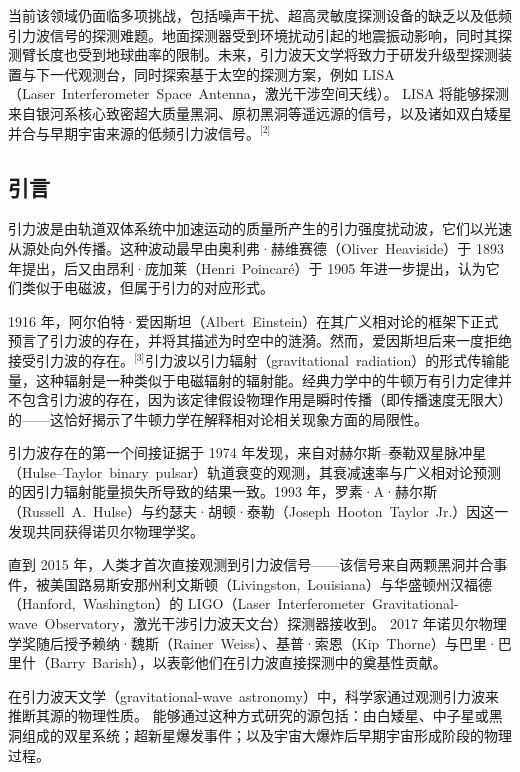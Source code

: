 当前该领域仍面临多项挑战，包括噪声干扰、超高灵敏度探测设备的缺乏以及低频引力波信号的探测难题。地面探测器受到环境扰动引起的地震振动影响，同时其探测臂长度也受到地球曲率的限制。未来，引力波天文学将致力于研发升级型探测装置与下一代观测台，同时探索基于太空的探测方案，例如 LISA（Laser~Interferometer~Space~Antenna，激光干涉空间天线）。  
LISA 将能够探测来自银河系核心致密超大质量黑洞、原初黑洞等遥远源的信号，以及诸如双白矮星并合与早期宇宙来源的低频引力波信号。\(^\text{[2]}\)
\subsection{引言}
引力波是由轨道双体系统中加速运动的质量所产生的引力强度扰动波，它们以光速从源处向外传播。这种波动最早由奥利弗·赫维赛德（Oliver~Heaviside）于 1893 年提出，后又由昂利·庞加莱（Henri~Poincaré）于 1905 年进一步提出，认为它们类似于电磁波，但属于引力的对应形式。


1916 年，阿尔伯特·爱因斯坦（Albert~Einstein）在其广义相对论的框架下正式预言了引力波的存在，并将其描述为时空中的涟漪。然而，爱因斯坦后来一度拒绝接受引力波的存在。\(^\text{[3]}\)引力波以引力辐射（gravitational~radiation）的形式传输能量，这种辐射是一种类似于电磁辐射的辐射能。经典力学中的牛顿万有引力定律并不包含引力波的存在，因为该定律假设物理作用是瞬时传播（即传播速度无限大）的——这恰好揭示了牛顿力学在解释相对论相关现象方面的局限性。

引力波存在的第一个间接证据于 1974 年发现，来自对赫尔斯–泰勒双星脉冲星（Hulse–Taylor~binary~pulsar）轨道衰变的观测，其衰减速率与广义相对论预测的因引力辐射能量损失所导致的结果一致。1993 年，罗素·A·赫尔斯（Russell~A.~Hulse）与约瑟夫·胡顿·泰勒（Joseph~Hooton~Taylor~Jr.）因这一发现共同获得诺贝尔物理学奖。

直到 2015 年，人类才首次直接观测到引力波信号——该信号来自两颗黑洞并合事件，被美国路易斯安那州利文斯顿（Livingston,~Louisiana）与华盛顿州汉福德（Hanford,~Washington）的 LIGO（Laser~Interferometer~Gravitational-wave~Observatory，激光干涉引力波天文台）探测器接收到。  
2017 年诺贝尔物理学奖随后授予赖纳·魏斯（Rainer~Weiss）、基普·索恩（Kip~Thorne）与巴里·巴里什（Barry~Barish），以表彰他们在引力波直接探测中的奠基性贡献。

在引力波天文学（gravitational-wave~astronomy）中，科学家通过观测引力波来推断其源的物理性质。  
能够通过这种方式研究的源包括：由白矮星、中子星或黑洞组成的双星系统；超新星爆发事件；以及宇宙大爆炸后早期宇宙形成阶段的物理过程。
